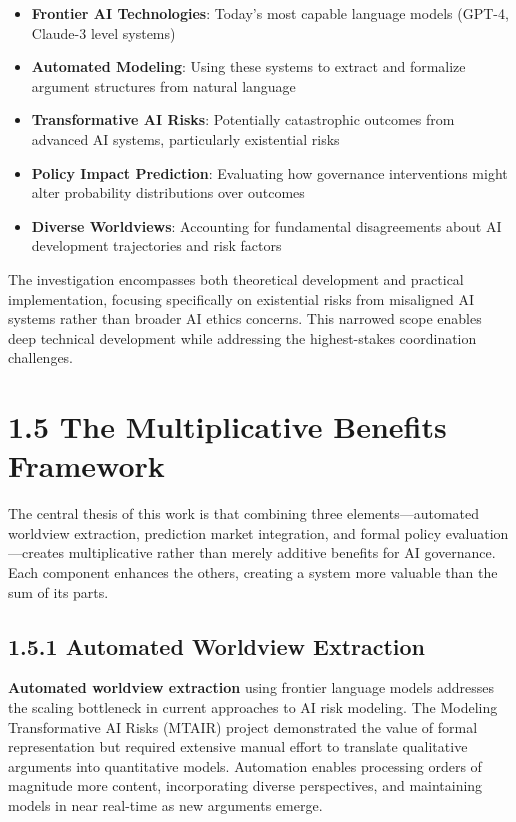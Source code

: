 \documentclass[
  11pt,
  letterpaper,
]{book}
\providecommand{\tightlist}{%
  \setlength{\itemsep}{0pt}\setlength{\parskip}{0pt}}
\begin{document}
\begin{itemize}
\tightlist
\item
  \textbf{Frontier AI Technologies}: Today's most capable language
  models (GPT-4, Claude-3 level systems)
\item
  \textbf{Automated Modeling}: Using these systems to extract and
  formalize argument structures from natural language
\item
  \textbf{Transformative AI Risks}: Potentially catastrophic outcomes
  from advanced AI systems, particularly existential risks
\item
  \textbf{Policy Impact Prediction}: Evaluating how governance
  interventions might alter probability distributions over outcomes
\item
  \textbf{Diverse Worldviews}: Accounting for fundamental disagreements
  about AI development trajectories and risk factors
\end{itemize}

The investigation encompasses both theoretical development and practical
implementation, focusing specifically on existential risks from
misaligned AI systems rather than broader AI ethics concerns. This
narrowed scope enables deep technical development while addressing the
highest-stakes coordination challenges.

\section*{1.5 The Multiplicative Benefits
Framework}\label{sec-multiplicative-benefits}


The central thesis of this work is that combining three
elements---automated worldview extraction, prediction market
integration, and formal policy evaluation---creates multiplicative
rather than merely additive benefits for AI governance. Each component
enhances the others, creating a system more valuable than the sum of its
parts.

\subsection*{1.5.1 Automated Worldview
Extraction}\label{sec-automated-extraction}

\textbf{Automated worldview extraction} using frontier language models
addresses the scaling bottleneck in current approaches to AI risk
modeling. The Modeling Transformative AI Risks (MTAIR) project
demonstrated the value of formal representation but required extensive
manual effort to translate qualitative arguments into quantitative
models. Automation enables processing orders of magnitude more content,
incorporating diverse perspectives, and maintaining models in near
real-time as new arguments emerge.
\end{document}
